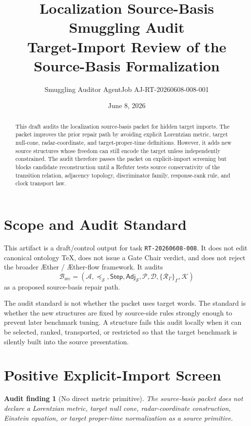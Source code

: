 \documentclass[11pt]{article}
\title{\textbf{Localization Source-Basis Smuggling Audit}\\[0.35em]
\large Target-Import Review of the Source-Basis Formalization}
\author{Smuggling Auditor AgentJob AJ-RT-20260608-008-001}
\date{June 8, 2026}
\newcommand{\Aether}{\AE{}ther}
\newcommand{\Aflow}{\AE{}ther-flow}
\newcommand{\TheoryProgram}{\Aether{} / \Aflow{} framework}
\newcommand{\Sub}{\mathcal{A}}
\newcommand{\Step}{\mathsf{Step}}
\newcommand{\Adj}{\mathsf{Adj}_{\mathcal{S}}}
\newcommand{\RespAlg}{\mathcal{R}_{\Gamma}}
\newcommand{\Basis}{\mathcal{B}_{\mathrm{src}}}
\newtheorem{auditfinding}{Audit finding}
\begin{document}
\maketitle

\begin{abstract}
This draft audits the localization source-basis packet for hidden target
imports. The packet improves the prior repair path by avoiding explicit
Lorentzian metric, target null-cone, radar-coordinate, and target-proper-time
definitions. However, it adds new source structures whose freedom can still
encode the target unless independently constrained. The audit therefore passes
the packet on explicit-import screening but blocks candidate reconstruction
until a Refuter tests source conservativity of the transition relation,
adjacency topology, discriminator family, response-rank rule, and clock
transport law.
\end{abstract}

\section{Scope and Audit Standard}

This artifact is a draft/control output for task \texttt{RT-20260608-008}. It
does not edit canonical ontology TeX, does not issue a Gate Chair verdict, and
does not reject the broader \TheoryProgram{}. It audits
\[
\Basis =
(\Sub,\preceq_{\mathcal{S}},\Step,\Adj,\mathcal{P},
\mathcal{D},\{\RespAlg\}_{\Gamma},\mathcal{K})
\]
as a proposed source-basis repair path.

The audit standard is not whether the packet uses target words. The standard
is whether the new structures are fixed by source-side rules strongly enough
to prevent later benchmark tuning. A structure fails this audit locally when
it can be selected, ranked, transported, or restricted so that the target
benchmark is silently built into the source presentation.

\section{Positive Explicit-Import Screen}

\begin{auditfinding}[No direct metric primitive]
The source-basis packet does not declare a Lorentzian metric, target null
cone, radar-coordinate construction, Einstein equation, or target proper-time
normalization as a source primitive.
\end{auditfinding}
\end{document}
